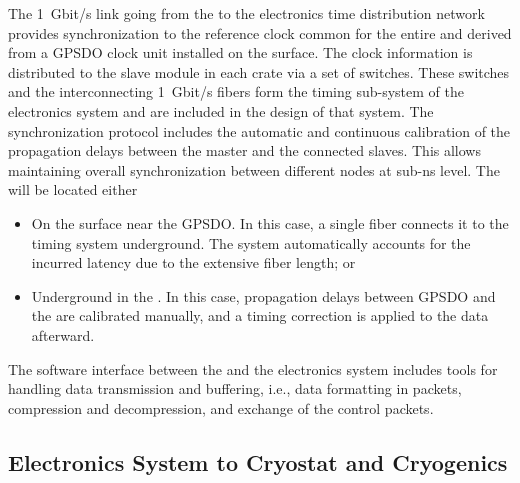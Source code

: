 The \SI{1}{Gbit/s} link going from the  to the \dual electronics time distribution network provides synchronization to the reference clock common for the entire  and derived from a GPSDO clock unit installed on the surface. The clock information is distributed to the  slave module in each  crate via a set of  switches. These switches and the interconnecting \SI{1}{Gbit/s} fibers form the timing sub-system of the \dual electronics system and are included in the design of that system. The  synchronization protocol includes the automatic and continuous calibration of the propagation delays between the master and the connected slaves. This allows maintaining overall synchronization between different nodes at sub-ns level. The  will be located either
\begin{itemize}
\item{On the surface near the GPSDO. In this case, a single fiber connects it to the \dual timing system underground. The system automatically accounts for the incurred latency due to the extensive fiber length; or}
\item{Underground in the . In this case, propagation delays between GPSDO and the  are calibrated manually, and a timing correction is applied to the data afterward.}
\end{itemize} 


The software interface between the  and the electronics system includes tools for handling data transmission and buffering, i.e.,  data formatting in  packets, compression and decompression, and exchange of the control packets.

\subsection{Electronics System to Cryostat and Cryogenics}
\label{ssec:dp-tpcelec-intfc-cryo}

